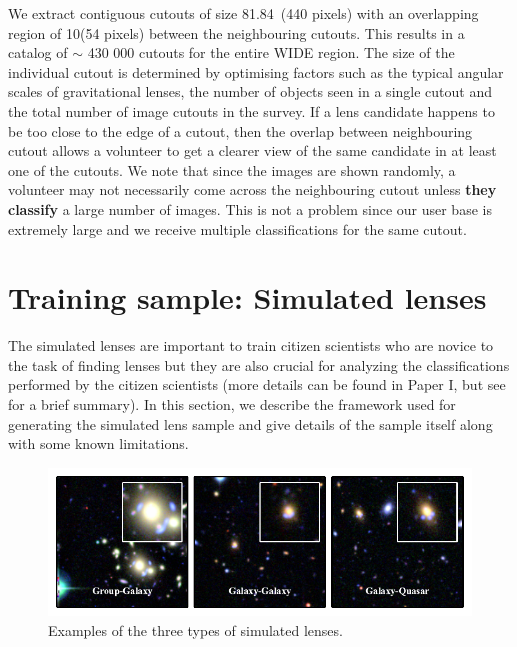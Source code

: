 \documentclass[useAMS,usenatbib,a4paper]{mn2e}
\begin{document}
We extract contiguous cutouts of size 81.84\arcsec\ (440 pixels) with an
overlapping region of 10\arcsec (54 pixels) between the neighbouring
cutouts. This  results in a catalog of $\sim$ 430 000 cutouts for the entire \cfhtls
WIDE region. The size of the individual cutout is determined by
optimising factors such as the typical angular scales of gravitational
lenses, the number of objects seen in a single cutout and the total
number of image cutouts in the survey. If a lens
candidate happens to be too close to the edge of a cutout, then the overlap
between neighbouring cutout allows a volunteer to get a clearer view
of the same candidate in at least one of the cutouts. We note that since
the images are shown randomly, a volunteer may not necessarily come
across the neighbouring cutout unless {\bf they classify} a large
number of images. This is not a problem since our user base is extremely
large and we receive multiple classifications for the same cutout.


\section{Training sample: Simulated lenses}
\label{sec:ts}

The simulated lenses are important to train citizen scientists who are
novice to the task of finding lenses but they are also crucial for
analyzing the classifications performed by the citizen scientists (more
details can be found in Paper I, but see  for a brief
summary). In this section, we describe the framework used for generating the
simulated lens sample and give details of the sample itself along with
some known limitations.

\begin{figure}
\begin{center}
\includegraphics[scale=1.0]{sim_cgq.pdf}
\caption{ \label{fig:sim}
Examples of the three types of simulated lenses.
}
\end{center}
\end{figure}
\end{document}
